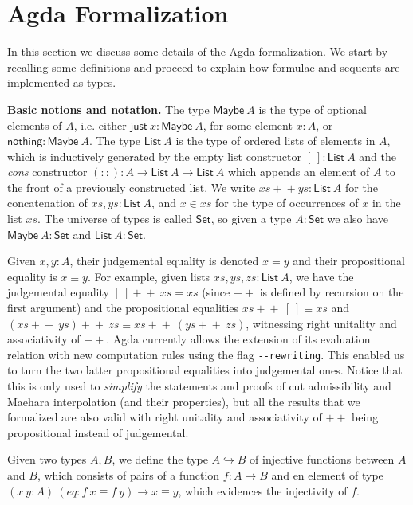 \documentclass[sn-mathphys-num]{sn-jnl}%
\newcommand{\List}{\mathsf{List}}
\newcommand{\Maybe}{\mathsf{Maybe}}
\newcommand{\nothing}{\mathsf{nothing}}
\newcommand{\just}{\mathsf{just}}
\newcommand{\append}{+\!\!+}
\newcommand{\Set}{\mathsf{Set}}
\theoremstyle{thmstyleone}%
\theoremstyle{thmstyletwo}%
\theoremstyle{thmstylethree}%
\begin{document}
\section{Agda Formalization}\label{sec:agda}

In this section we discuss some details of the Agda formalization.
We start by recalling some definitions and proceed to explain how formulae and sequents are implemented as types.


\noindent\textbf{Basic notions and notation.}
The type $\Maybe ~A$ is the type of optional elements of $A$, i.e. either $\just ~x : \Maybe ~A$, for some element $x : A$, or $\nothing : \Maybe ~A$.
The type $\List ~A$ is the type of ordered lists of elements in $A$, which is inductively generated by the empty list constructor $[~] : \List ~A$ and the \emph{cons} constructor $(::) : A \to \List ~A \to \List ~A$ which appends an element of $A$ to the front of a previously constructed list.
We write $xs +\!\!+ ys : \List ~A$ for the concatenation of $xs, ys : \List ~A$, and $x \in xs$ for the type of occurrences of $x$ in the list $xs$.
The universe of types is called $\Set$, so given a type $A : \Set$ we also have $\Maybe ~A : \Set$ and $\List ~A : \Set$.

Given $x,y : A$, their judgemental equality is denoted $x = y$ and their propositional equality is $x \equiv y$.
For example, given lists $xs,ys,zs : \List ~A$, we have the judgemental equality $[~] \append~ xs = xs$ (since $\append$ is defined by recursion on the first argument) and the propositional equalities $xs \append ~[~] \equiv xs$ and $(xs \append ~ys) \append ~zs \equiv xs \append ~(ys \append ~zs)$, witnessing right unitality and associativity of $\append$.
Agda currently allows the extension of its evaluation relation with new computation rules using the flag \verb+--rewriting+.
This enabled us to turn the two latter propositional equalities into judgemental ones. Notice that this is only used to \emph{simplify} the statements and proofs of cut admissibility and Maehara interpolation (and their properties), but all the results that we  formalized are also valid with right unitality and associativity of $\append$ being propositional instead of judgemental.

Given two types $A,B$, we define the type $A \hookrightarrow B$ of injective functions between $A$ and $B$, which consists of pairs of a function $f : A \to B$  and en element of type $(x ~y : A) ~(eq : f~x \equiv f ~y) \to x \equiv y$, which evidences the injectivity of $f$.
\end{document}
